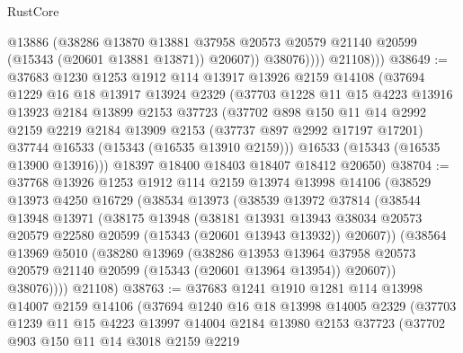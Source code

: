 \begin{lexlean}{RustCore}
\begin{coremodule}
                    @13886
                    (@38286
                      @13870
                      @13881
                      @37958
                      @20573
                      @20579
                      @21140
                      @20599
                      (@15343 (@20601 @13881 @13871))
                      @20607))
                  @38076))))
          @21108)))
@38649 := @37683
    @1230
    @1253
    @1912
    @114
    @13917
    @13926
    @2159
    @14108
    (@37694
      @1229
      @16
      @18
      @13917
      @13924
      @2329
      (@37703
        @1228
        @11
        @15
        @4223
        @13916
        @13923
        @2184
        @13899
        @2153
        @37723
        (@37702
          @898
          @150
          @11
          @14
          @2992
          @2159
          @2219
          @2184
          @13909
          @2153
          (@37737 @897 @2992 @17197 @17201)
          @37744
          @16533
          (@15343 (@16535 @13910 @2159)))
        @16533
        (@15343 (@16535 @13900 @13916)))
      @18397
      @18400
      @18403
      @18407
      @18412
      @20650)
@38704 := @37768
    @13926
    @1253
    @1912
    @114
    @2159
    @13974
    @13998
    @14106
    (@38529
      @13973
      @4250
      @16729
      (@38534
        @13973
        (@38539
          @13972
          @37814
          (@38544
            @13948
            @13971
            (@38175
              @13948
              (@38181
                @13931
                @13943
                @38034
                @20573
                @20579
                @22580
                @20599
                (@15343 (@20601 @13943 @13932))
                @20607))
            (@38564
              @13969
              @5010
              (@38280
                @13969
                (@38286
                  @13953
                  @13964
                  @37958
                  @20573
                  @20579
                  @21140
                  @20599
                  (@15343 (@20601 @13964 @13954))
                  @20607))
              @38076))))
      @21108)
@38763 := @37683
    @1241
    @1910
    @1281
    @114
    @13998
    @14007
    @2159
    @14106
    (@37694
      @1240
      @16
      @18
      @13998
      @14005
      @2329
      (@37703
        @1239
        @11
        @15
        @4223
        @13997
        @14004
        @2184
        @13980
        @2153
        @37723
        (@37702
          @903
          @150
          @11
          @14
          @3018
          @2159
          @2219

\end{coremodule}
\end{lexlean}
